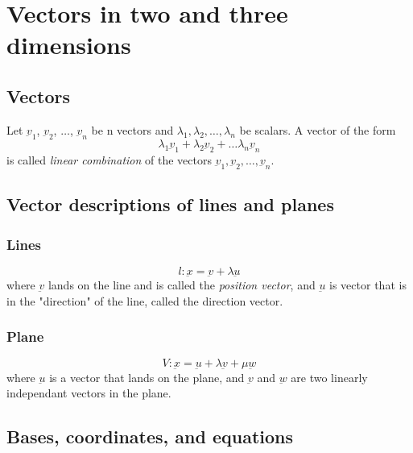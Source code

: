 \section{Vectors in two and three dimensions}

\subsection{Vectors}

\begin{definition}
    Let $\underbar{v}_1$, $\underbar{v}_2$, $\dots$, $\underbar{v}_n$
    be n vectors and $\lambda_1, \lambda_2, \dots, \lambda_n$ be
    scalars. A vector of the form
    $$ \lambda_1\underbar{v}_1 + \lambda_2\underbar{v}_2 + \dots \lambda_n\underbar{v}_n $$
    is called \emph{linear combination} of the vectors $\underbar{v}_1,\underbar{v}_2,\dots,\underbar{v}_n$.

\end{definition}

\subsection{Vector descriptions of lines and planes}

\subsubsection{Lines}
$$ \textit{l}: \underbar{x} = \underbar{v} + \lambda \underbar{u} $$
where $\underbar{v}$ lands on the line and is called the \emph{position vector},
and $\underbar{u}$ is vector that is in the "direction" of the line, called the
direction vector.

\subsubsection{Plane}
$$ V: \underbar{x} = \underbar{u} + \lambda\underbar{v} + \mu\underbar{w} $$
where $\underbar{u}$ is a vector that lands on the plane, and $\underbar{v}$
and $\underbar{w}$ are two linearly independant vectors in the plane.

\subsection{Bases, coordinates, and equations}

